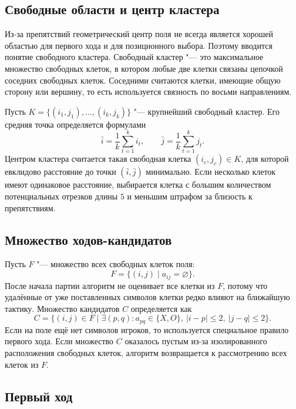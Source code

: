 \documentclass[a4paper,14pt]{extarticle}
\begin{document}
\subsection{Свободные области и центр кластера}

Из-за препятствий геометрический центр поля не всегда является хорошей областью для первого хода и для позиционного выбора. Поэтому вводится понятие свободного кластера. Свободный кластер "--- это максимальное множество свободных клеток, в котором любые две клетки связаны цепочкой соседних свободных клеток. Соседними считаются клетки, имеющие общую сторону или вершину, то есть используется связность по восьми направлениям.

Пусть $K=\{(i_1,j_1),\ldots,(i_k,j_k)\}$ "--- крупнейший свободный кластер. Его средняя точка определяется формулами
\begin{equation}
\bar{i}=\frac{1}{k}\sum_{t=1}^{k} i_t, \qquad
\bar{j}=\frac{1}{k}\sum_{t=1}^{k} j_t.
\label{eq:cluster_mean}
\end{equation}
Центром кластера считается такая свободная клетка $(i_c,j_c)\in K$, для которой евклидово расстояние до точки $(\bar{i},\bar{j})$ минимально. Если несколько клеток имеют одинаковое расстояние, выбирается клетка с большим количеством потенциальных отрезков длины $5$ и меньшим штрафом за близость к препятствиям.

\subsection{Множество ходов-кандидатов}

Пусть $F$ "--- множество всех свободных клеток поля:
\[
F = \{(i,j) \mid a_{ij}=\varnothing\}.
\]
После начала партии алгоритм не оценивает все клетки из $F$, потому что удалённые от уже поставленных символов клетки редко влияют на ближайшую тактику. Множество кандидатов $C$ определяется как
\begin{equation}
C = \{(i,j)\in F \mid \exists (p,q): a_{pq}\in\{X,O\},\ |i-p|\leq 2,\ |j-q|\leq 2\}.
\label{eq:candidates}
\end{equation}
Если на поле ещё нет символов игроков, то используется специальное правило первого хода. Если множество $C$ оказалось пустым из-за изолированного расположения свободных клеток, алгоритм возвращается к рассмотрению всех клеток из $F$.

\subsection{Первый ход}
\end{document}
